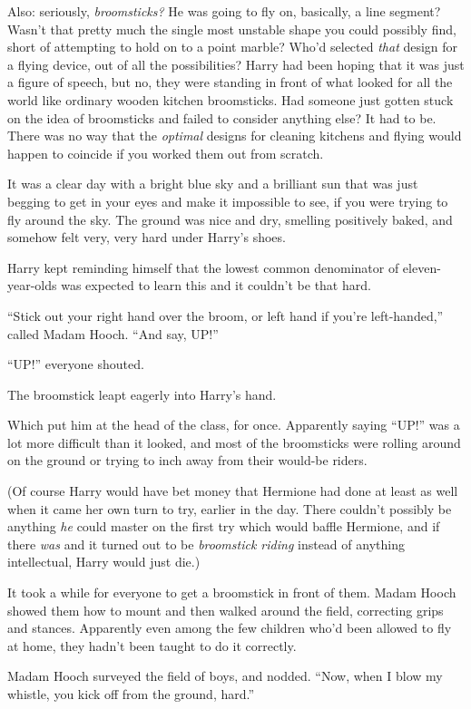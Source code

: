 Also: seriously, \emph{broomsticks?} He was going to fly on, basically,
a line segment? Wasn't that pretty much the single most unstable shape
you could possibly find, short of attempting to hold on to a point
marble? Who'd selected \emph{that} design for a flying device, out of
all the possibilities? Harry had been hoping that it was just a figure
of speech, but no, they were standing in front of what looked for all
the world like ordinary wooden kitchen broomsticks. Had someone just
gotten stuck on the idea of broomsticks and failed to consider anything
else? It had to be. There was no way that the \emph{optimal} designs for
cleaning kitchens and flying would happen to coincide if you worked them
out from scratch.

It was a clear day with a bright blue sky and a brilliant sun that was
just begging to get in your eyes and make it impossible to see, if you
were trying to fly around the sky. The ground was nice and dry, smelling
positively baked, and somehow felt very, very hard under Harry's shoes.

Harry kept reminding himself that the lowest common denominator of
eleven-year-olds was expected to learn this and it couldn't be that
hard.

``Stick out your right hand over the broom, or left hand if you're
left-handed,'' called Madam Hooch. ``And say, UP!''

``UP!'' everyone shouted.

The broomstick leapt eagerly into Harry's hand.

Which put him at the head of the class, for once. Apparently saying
``UP!'' was a lot more difficult than it looked, and most of the
broomsticks were rolling around on the ground or trying to inch away
from their would-be riders.

(Of course Harry would have bet money that Hermione had done at least as
well when it came her own turn to try, earlier in the day. There
couldn't possibly be anything \emph{he} could master on the first try
which would baffle Hermione, and if there \emph{was} and it turned out
to be \emph{broomstick riding} instead of anything intellectual, Harry
would just die.)

It took a while for everyone to get a broomstick in front of them. Madam
Hooch showed them how to mount and then walked around the field,
correcting grips and stances. Apparently even among the few children
who'd been allowed to fly at home, they hadn't been taught to do it
correctly.

Madam Hooch surveyed the field of boys, and nodded. ``Now, when I blow
my whistle, you kick off from the ground, hard.''

